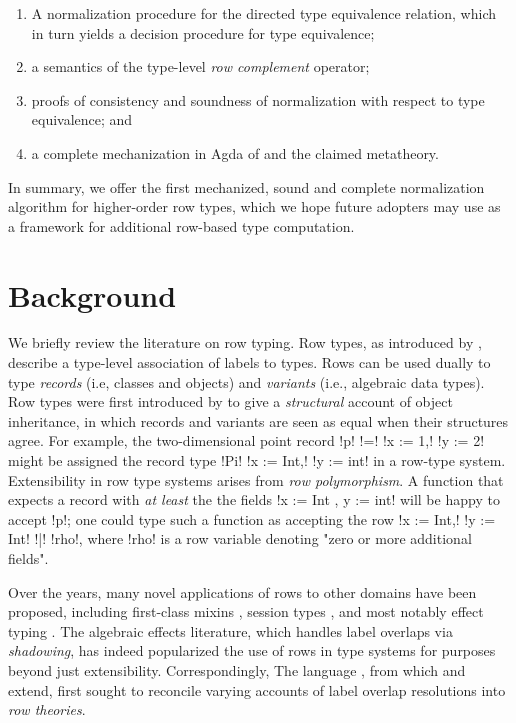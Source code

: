 \documentclass[sigplan,10pt,anonymous,review]{acmart}\settopmatter{printfolios=true,printccs=false,printacmref=false}
\begin{document}
\begin{enumerate}
  \item A normalization procedure for the directed \Rome type equivalence relation, which in turn yields a decision procedure for type equivalence;
  \item a semantics of the type-level \emph{row complement} operator;
  \item proofs of consistency and soundness of normalization with respect to type equivalence; and
  \item a complete mechanization in Agda of \Rome and the claimed metatheory.
\end{enumerate}

In summary, we offer the first mechanized, sound and complete normalization algorithm for higher-order row types, which we hope future adopters may use as a framework for additional row-based type  computation.

\section{Background}
We briefly review the literature on row typing. Row types, as introduced by \citet{wand87}, describe a type-level association of labels to types. Rows can be used dually to type \emph{records} (i.e, classes and objects) and \emph{variants} (i.e., algebraic data types). Row types were first introduced by \citet{wand87,Wand91,Remy89} to give a \emph{structural} account of object inheritance, in which records and variants are seen as equal when their structures agree. For example, the two-dimensional point record !p! !=! !{x := 1,! !y := 2}! might be assigned the record type !Pi! !{x := Int,! !y := int}! in a row-type system. Extensibility in row type systems arises from \emph{row polymorphism}. A function that expects a record with \emph{at least} the the fields !{x := Int , y := int}! will be happy to accept !p!; one could type such a function as accepting the row !{x := Int,! !y := Int! !|! !rho}!, where !rho! is a row variable denoting "zero or more additional fields".

Over the years, many novel applications of rows to other domains have been proposed, including first-class mixins \citep{MakholmW05}, session types \citep{LindleyM17}, and most notably effect typing \citep{Leijen05,Leijen14,LindleyC12,HillerstromL16}. The algebraic effects literature, which handles label overlaps via \emph{shadowing}, has indeed popularized the use of rows in type systems for purposes beyond just extensibility. Correspondingly, The \Rose language \citep{MorrisM19}, from which \RO and \Rome extend, first sought to reconcile varying accounts of label overlap resolutions into \emph{row theories}. 
\end{document}
